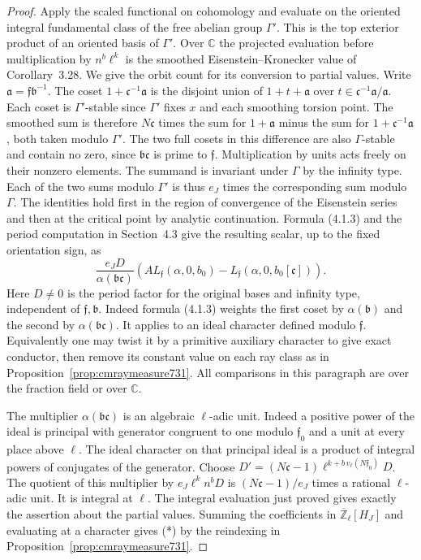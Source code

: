 \documentclass[a4paper,11pt]{article}
\theoremstyle{definition}
\theoremstyle{remark}
\newcommand{\ZZ}{\mathbb Z}\newcommand{\ord}{\operatorname{ord}}
\numberwithin{equation}{section}
\begin{document}
\begin{proof}
Apply the scaled functional on cohomology and evaluate on the
oriented integral fundamental class of the free abelian group
\(\Gamma'\). This is the top exterior product of an oriented basis
of \(\Gamma'\). Over \(\mathbb C\) the projected evaluation before
multiplication by \(n^b\ell^k\) is the smoothed Eisenstein--Kronecker
value of Corollary~3.28. We give the orbit count for its conversion
to partial values. Write \(\mathfrak a=\mathfrak f\mathfrak b^{-1}\).
The coset \(1+\mathfrak c^{-1}\mathfrak a\) is the disjoint union of
\(1+t+\mathfrak a\) over \(t\in\mathfrak c^{-1}\mathfrak a/
\mathfrak a\). Each coset is \(\Gamma'\)-stable since \(\Gamma'\)
fixes \(x\) and each smoothing torsion point. The smoothed sum is
therefore \(N\mathfrak c\) times the sum for \(1+\mathfrak a\)
minus the sum for \(1+\mathfrak c^{-1}\mathfrak a\), both taken
modulo \(\Gamma'\). The two full cosets in this difference are
also \(\Gamma\)-stable and contain no zero, since
\(\mathfrak b\mathfrak c\) is prime to \(\mathfrak f\).
Multiplication by units acts freely on their nonzero elements.
The summand is invariant under \(\Gamma\) by the infinity type.
Each of the two sums modulo \(\Gamma'\) is thus \(e_J\) times the
corresponding sum modulo \(\Gamma\). The identities hold first in
the region of convergence of the Eisenstein series and then at the
critical point by analytic continuation. Formula (4.1.3) and the
period computation in Section~4.3 give the resulting scalar,
up to the fixed orientation sign, as
\[
 \frac{e_J D}{\alpha(\mathfrak b\mathfrak c)}
   \left(A L_{\mathfrak f}(\alpha,0,b_0)
               - L_{\mathfrak f}(\alpha,0,b_0[\mathfrak c])\right).
\]
Here \(D\ne0\) is the period factor for the original bases and
infinity type, independent of \(\mathfrak f,\mathfrak b\).
Indeed formula (4.1.3) weights the first coset by
\(\alpha(\mathfrak b)\) and the second by
\(\alpha(\mathfrak b\mathfrak c)\). It applies to an ideal character
defined modulo \(\mathfrak f\). Equivalently one may twist it by
a primitive auxiliary character to give exact conductor, then
remove its constant value on each ray class as in
Proposition~\ref{prop:cmraymeasure731}. All comparisons in this
paragraph are over the fraction field or over \(\mathbb C\).
\cite{II-II-kingssprang731}

The multiplier \(\alpha(\mathfrak b\mathfrak c)\) is an algebraic
\(\ell\)-adic unit. Indeed a positive power of the ideal is
principal with generator congruent to one modulo \(\mathfrak f_0\)
and a unit at every place above \(\ell\). The ideal character on
that principal ideal is a product of integral powers of conjugates
of the generator. Choose
\(D'=(N\mathfrak c-1)\ell^{k+b\,v_\ell(N\mathfrak f_0)}D\).
The quotient of this multiplier by \(e_J\ell^k n^b D\) is
\((N\mathfrak c-1)/e_J\) times a rational \(\ell\)-adic unit.
It is integral at \(\ell\). The integral evaluation just proved gives
exactly the assertion about the partial values. Summing the
coefficients in \(\overline{\ZZ}_\ell[H_J]\) and evaluating at a
character gives (*) by the reindexing in
Proposition~\ref{prop:cmraymeasure731}.
\end{proof}
\end{document}
